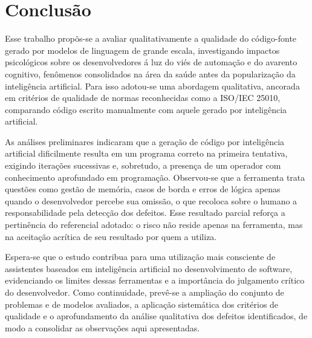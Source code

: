 \chapter{Conclusão}
Esse trabalho propõs-se a avaliar qualitativamente a qualidade do 
código-fonte gerado por modelos de linguagem de grande escala, investigando 
impactos psicológicos sobre os desenvolvedores á luz do viés de automação e do 
avarento cognitivo, fenômenos consolidados na área da saúde antes da 
popularização da inteligência artificial. Para isso adotou-se uma abordagem 
qualitativa, ancorada em critérios de qualidade de normas reconhecidas como a 
ISO/IEC 25010, comparando código escrito manualmente com aquele gerado por 
inteligência artificial. 

As análises preliminares indicaram que a geração de código por inteligência 
artificial dificilmente resulta em um programa correto na primeira tentativa, exigindo 
iterações sucessivas e, sobretudo, a presença de um operador com conhecimento 
aprofundado em programação. Observou-se que a ferramenta trata questões como 
gestão de memória, casos de borda e erros de lógica apenas quando o 
desenvolvedor percebe sua omissão, o que recoloca sobre o humano a 
responsabilidade pela detecção dos defeitos. Esse resultado parcial reforça a pertinência do referencial adotado: o risco não reside apenas na ferramenta, mas na 
aceitação acrítica de seu resultado por quem a utiliza. 

Espera-se que o estudo contribua para uma utilização mais consciente de 
assistentes baseados em inteligência artificial no desenvolvimento de software, 
evidenciando os limites dessas ferramentas e a importância do julgamento crítico do 
desenvolvedor. Como continuidade, prevê-se a ampliação do conjunto de problemas 
e de modelos avaliados, a aplicação sistemática dos critérios de qualidade e o 
aprofundamento da análise qualitativa dos defeitos identificados, de modo a 
consolidar as observações aqui apresentadas.
